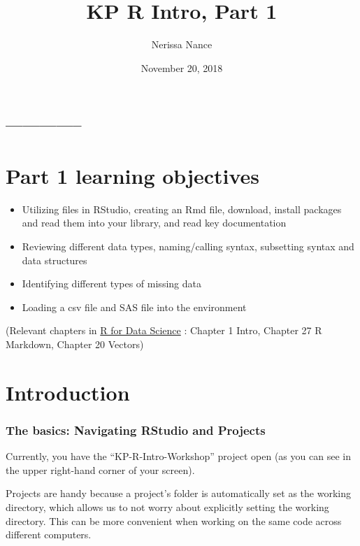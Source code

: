\documentclass[]{article}
\title{KP R Intro, Part 1}
\author{Nerissa Nance}
\date{November 20, 2018}
\providecommand{\tightlist}{%
  \setlength{\itemsep}{0pt}\setlength{\parskip}{0pt}}
\begin{document}
\maketitle

{
\setcounter{tocdepth}{2}
\tableofcontents
}
\subsection{--------------}\label{section}

\section{Part 1 learning objectives}\label{part-1-learning-objectives}

\begin{itemize}
\tightlist
\item
  Utilizing files in RStudio, creating an Rmd file, download, install
  packages and read them into your library, and read key documentation
\item
  Reviewing different data types, naming/calling syntax, subsetting
  syntax and data structures
\item
  Identifying different types of missing data
\item
  Loading a csv file and SAS file into the environment
\end{itemize}

(Relevant chapters in \href{https://r4ds.had.co.nz/}{R for Data Science}
: Chapter 1 Intro, Chapter 27 R Markdown, Chapter 20 Vectors)

\section{Introduction}\label{introduction}

\subsubsection{The basics: Navigating RStudio and
Projects}\label{the-basics-navigating-rstudio-and-projects}

Currently, you have the ``KP-R-Intro-Workshop'' project open (as you can
see in the upper right-hand corner of your screen).

Projects are handy because a project's folder is automatically set as
the working directory, which allows us to not worry about explicitly
setting the working directory. This can be more convenient when working
on the same code across different computers.
\end{document}
